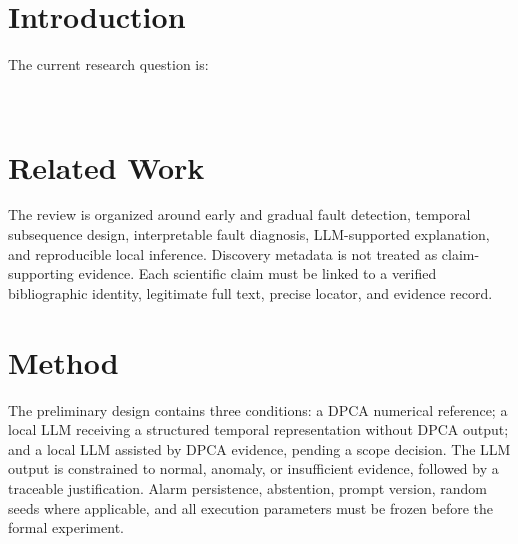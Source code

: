 \documentclass[a4paper,12pt]{article}
\title{\ResearchTitleEN}
\author{\researchauthor}
\date{\researchyear}
\begin{document}
\maketitle

\begin{abstract}
\ResearchProblemEN\ The study proposes a causal progressive-window evaluation in which DPCA serves as an instrumental statistical reference and a local open LLM produces traceable classifications and explanations. Detection delay, false alarms, consistency, explanation fidelity, latency, resource use, and outbound network activity are evaluated separately. No experimental result is claimed in the current provisional version; the contribution is the governed and reproducible evaluation protocol.
\end{abstract}

\section{Introduction}
\ResearchProblemEN

The current research question is:

\begin{quote}
\ResearchQuestionEN
\end{quote}

\ResearchObjectiveEN\ \ResearchContributionEN

\section{Related Work}
\LiteratureStatusEN

The review is organized around early and gradual fault detection, temporal subsequence design, interpretable fault diagnosis, LLM-supported explanation, and reproducible local inference. Discovery metadata is not treated as claim-supporting evidence. Each scientific claim must be linked to a verified bibliographic identity, legitimate full text, precise locator, and evidence record.

\section{Method}
\ResearchMethodEN

The preliminary design contains three conditions: a DPCA numerical reference; a local LLM receiving a structured temporal representation without DPCA output; and a local LLM assisted by DPCA evidence, pending a scope decision. The LLM output is constrained to normal, anomaly, or insufficient evidence, followed by a traceable justification. Alarm persistence, abstention, prompt version, random seeds where applicable, and all execution parameters must be frozen before the formal experiment.
\end{document}
